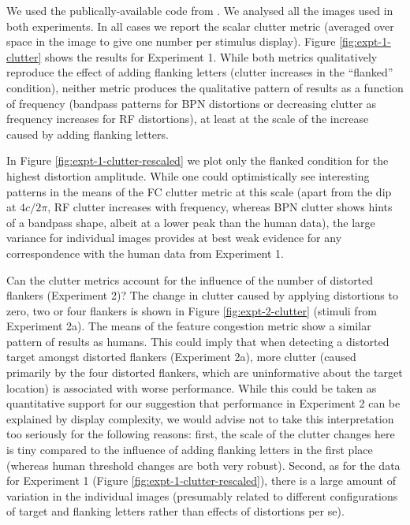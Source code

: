 \documentclass[doc, 11pt,a4paper,natbib]{apa6}\usepackage[]{graphicx}\usepackage[]{color}
\begin{document}
We used the publically-available code from \citet[][see \url{https://dspace.mit.edu/handle/1721.1/37593}]{rosenholtz_measuring_2007}.
We analysed all the images used in both experiments.
In all cases we report the scalar clutter metric (averaged over space in the image to give one number per stimulus display).
Figure \ref{fig:expt-1-clutter} shows the results for Experiment 1.
While both metrics qualitatively reproduce the effect of adding flanking letters (clutter increases in the ``flanked'' condition), neither metric produces the qualitative pattern of results as a function of frequency (bandpass patterns for BPN distortions or decreasing clutter as frequency increases for RF distortions), at least at the scale of the increase caused by adding flanking letters.

In Figure \ref{fig:expt-1-clutter-rescaled} we plot only the flanked condition for the highest distortion amplitude.
While one could optimistically see interesting patterns in the means of the FC clutter metric at this scale (apart from the dip at $4 c/2\pi$, RF clutter increases with frequency, whereas BPN clutter shows hints of a bandpass shape, albeit at a lower peak than the human data), the large variance for individual images provides at best weak evidence for any correspondence with the human data from Experiment 1.

Can the clutter metrics account for the influence of the number of distorted flankers (Experiment 2)?
The change in clutter caused by applying distortions to zero, two or four flankers is shown in Figure \ref{fig:expt-2-clutter} (stimuli from Experiment 2a).
The means of the feature congestion metric show a similar pattern of results as humans.
This could imply that when detecting a distorted target amongst distorted flankers (Experiment 2a), more clutter (caused primarily by the four distorted flankers, which are uninformative about the target location) is associated with worse performance.
While this could be taken as quantitative support for our suggestion that performance in Experiment 2 can be explained by display complexity, we would advise not to take this interpretation too seriously for the following reasons:
first, the scale of the clutter changes here is tiny compared to the influence of adding flanking letters in the first place (whereas human threshold changes are both very robust).
Second, as for the data for Experiment 1 (Figure \ref{fig:expt-1-clutter-rescaled}), there is a large amount of variation in the individual images (presumably related to different configurations of target and flanking letters rather than effects of distortions per se).
\end{document}

